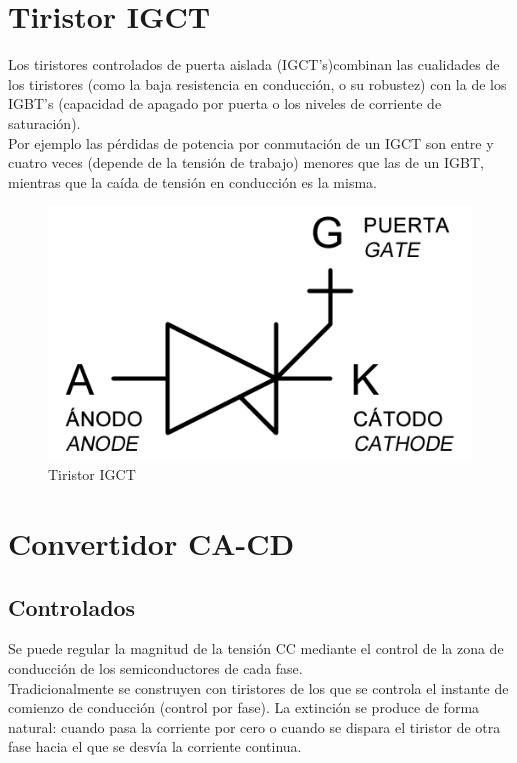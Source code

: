 \documentclass[12pt,a4paper]{article}
\begin{document}
\newpage
\section*{Tiristor IGCT}
Los tiristores controlados de puerta aislada (IGCT's)combinan las cualidades de los tiristores (como la baja resistencia en conducción, o su robustez) con la de los IGBT's (capacidad de apagado por puerta o los niveles de corriente de saturación).\\
Por ejemplo las pérdidas de potencia por conmutación de un IGCT son entre y cuatro veces (depende de la tensión de trabajo) menores que las de un IGBT, mientras que la caída de tensión en conducción es la misma.
\begin{figure}[hbtp]
\centering
\includegraphics[scale=0.2]{Circuitos/TiristorIGCT.png}
\caption{Tiristor IGCT}
\end{figure}

\section{Convertidor CA-CD}
\subsection{Controlados}
Se puede regular la magnitud de la tensión CC mediante el control de la zona de conducción de los semiconductores de cada fase.\\ 
Tradicionalmente se construyen con tiristores de los que se controla el instante de comienzo de conducción (control por fase). La extinción se produce de forma natural: cuando pasa la corriente por cero o cuando se dispara el tiristor de otra fase hacia el que se desvía la corriente continua.
\end{document}
